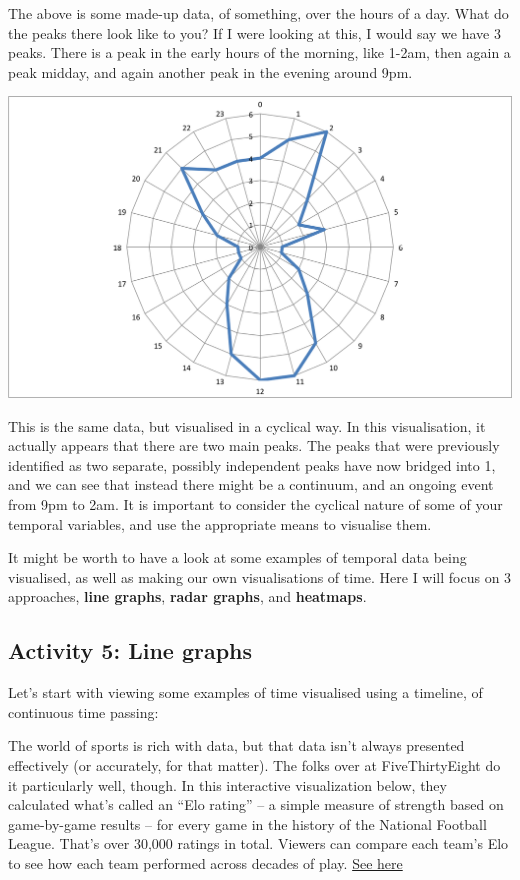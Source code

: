\documentclass[]{book}
\theoremstyle{definition}
\theoremstyle{definition}
\theoremstyle{definition}
\theoremstyle{remark}
\begin{document}
The above is some made-up data, of something, over the hours of a day.
What do the peaks there look like to you? If I were looking at this, I
would say we have 3 peaks. There is a peak in the early hours of the
morning, like 1-2am, then again a peak midday, and again another peak in
the evening around 9pm.

\includegraphics{imgs/time_radar_ex.png}

This is the same data, but visualised in a cyclical way. In this
visualisation, it actually appears that there are two main peaks. The
peaks that were previously identified as two separate, possibly
independent peaks have now bridged into 1, and we can see that instead
there might be a continuum, and an ongoing event from 9pm to 2am. It is
important to consider the cyclical nature of some of your temporal
variables, and use the appropriate means to visualise them.

It might be worth to have a look at some examples of temporal data being
visualised, as well as making our own visualisations of time. Here I
will focus on 3 approaches, \textbf{line graphs}, \textbf{radar graphs},
and \textbf{heatmaps}.

\hypertarget{activity-5-line-graphs}{%
\subsection{Activity 5: Line graphs}\label{activity-5-line-graphs}}

Let's start with viewing some examples of time visualised using a
timeline, of continuous time passing:

The world of sports is rich with data, but that data isn't always
presented effectively (or accurately, for that matter). The folks over
at FiveThirtyEight do it particularly well, though. In this interactive
visualization below, they calculated what's called an ``Elo rating'' --
a simple measure of strength based on game-by-game results -- for every
game in the history of the National Football League. That's over 30,000
ratings in total. Viewers can compare each team's Elo to see how each
team performed across decades of play.
\href{http://projects.fivethirtyeight.com/complete-history-of-the-nfl/\#ari}{See
here}
\end{document}
